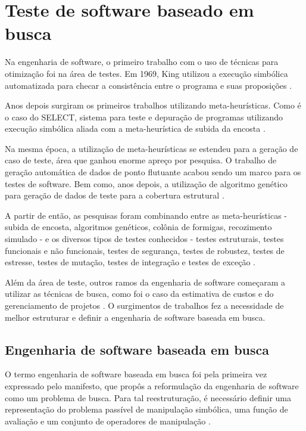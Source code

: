 \section{Teste de software baseado em busca}

Na engenharia de software, o primeiro trabalho com o uso de técnicas para otimização foi na área de testes. Em 1969, King utilizou a execução simbólica automatizada para checar a consistência entre o programa e suas proposições \cite{king1969program}. 

Anos depois surgiram os primeiros trabalhos utilizando meta-heurísticas. Como é o caso do SELECT, sistema para teste e depuração de programas utilizando execução simbólica aliada com a meta-heurística de subida da encosta \cite{boyer1975select}.

Na mesma época, a utilização de meta-heurísticas se estendeu para a geração de caso de teste, área que ganhou enorme apreço por pesquisa. O trabalho de geração automática de dados de ponto flutuante \cite{miller1976automatic} acabou sendo um marco para os testes de software. Bem como, anos depois, a utilização de algoritmo genético para geração de dados de teste para a cobertura estrutural \cite{xanthakis1992application}.

A partir de então, as pesquisas foram combinando entre as meta-heurísticas - subida de encosta, algoritmos genéticos, colônia de formigas, recozimento simulado - e os diversos tipos de testes  conhecidos - testes estruturais, testes funcionais e não funcionais, testes de segurança, testes de robustez, testes de estresse, testes de mutação, testes de integração e testes de exceção \cite{harman2009search}.

Além da área de teste, outros ramos da engenharia de software começaram a utilizar as técnicas de busca, como foi o caso da estimativa de custos e do gerenciamento de projetos \cite{de2011ten}. O surgimentos de trabalhos fez a necessidade de melhor estruturar e definir a engenharia de software baseada em busca.

\subsection{Engenharia de software baseada em busca}

O termo engenharia de software baseada em busca foi pela primeira vez expressado pelo manifesto, que propôs a reformulação da engenharia de software como um problema de busca. Para tal reestruturação, é necessário definir uma representação do problema passível de manipulação simbólica, uma função de avaliação e um conjunto de operadores de manipulação \cite{harman2001search}.


